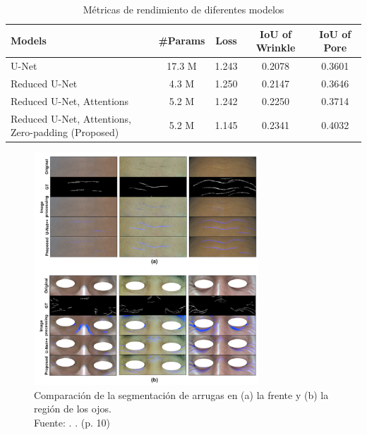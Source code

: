 \begin{table}[H]
    \centering
    \caption{Métricas de rendimiento de diferentes modelos}
    \renewcommand{\arraystretch}{1.2} %
    \setlength{\tabcolsep}{5pt} %
    \begin{tabularx}{\textwidth}{@{}X c c c c@{}}
        \toprule
        \textbf{Models} & \textbf{\#Params} & \textbf{Loss} & \textbf{IoU of Wrinkle} & \textbf{IoU of Pore} \\ \midrule
        U-Net & 17.3 M & 1.243 & 0.2078 & 0.3601 \\
        Reduced U-Net & 4.3 M & 1.250 & 0.2147 & 0.3646 \\
        Reduced U-Net, Attentions & 5.2 M & 1.242 & 0.2250 & 0.3714 \\
        Reduced U-Net, Attentions, Zero-padding (Proposed) & 5.2 M & 1.145 & 0.2341 & 0.4032 \\ 
        \bottomrule
    \end{tabularx}
    \label{tab:models_performance}
\end{table}


\begin{figure}[H]
	\begin{center}
		\includegraphics[width=0.75\textwidth]{2/figures/resant1.png}
		\caption[Comparación de la segmentación de arrugas en (a) la frente y (b) la región de los ojos]{Comparación de la segmentación de arrugas en (a) la frente y (b) la región de los ojos.\\
			Fuente: \cite{yoon2023}. . (p. 10)}
		\label{2:fig1}
	\end{center}
\end{figure}

